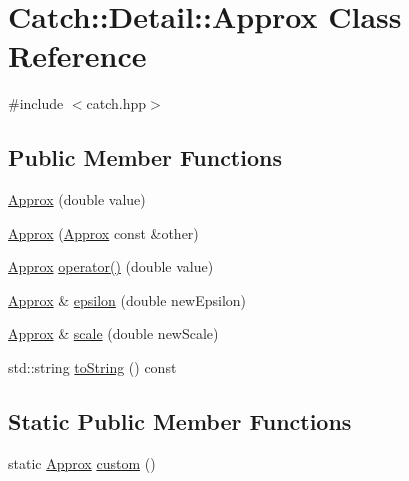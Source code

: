 \hypertarget{class_catch_1_1_detail_1_1_approx}{}\section{Catch\+:\+:Detail\+:\+:Approx Class Reference}
\label{class_catch_1_1_detail_1_1_approx}


{\ttfamily \#include $<$catch.\+hpp$>$}

\subsection*{Public Member Functions}
\begin{DoxyCompactItemize}
\item 
\hyperlink{class_catch_1_1_detail_1_1_approx_a1a8618ea8db08c66bd3d9fe8f74b957a}{Approx} (double value)
\item 
\hyperlink{class_catch_1_1_detail_1_1_approx_a807330c63266fc914abdf6e461255a54}{Approx} (\hyperlink{class_catch_1_1_detail_1_1_approx}{Approx} const \&other)
\item 
\hyperlink{class_catch_1_1_detail_1_1_approx}{Approx} \hyperlink{class_catch_1_1_detail_1_1_approx_a48c9cbc28a05dc9dc8c3973b9eae2268}{operator()} (double value)
\item 
\hyperlink{class_catch_1_1_detail_1_1_approx}{Approx} \& \hyperlink{class_catch_1_1_detail_1_1_approx_a05c50c3ad0a971fab19345b5d94979a9}{epsilon} (double new\+Epsilon)
\item 
\hyperlink{class_catch_1_1_detail_1_1_approx}{Approx} \& \hyperlink{class_catch_1_1_detail_1_1_approx_acd80f0737bf38112beacd5ca95bef113}{scale} (double new\+Scale)
\item 
std\+::string \hyperlink{class_catch_1_1_detail_1_1_approx_a972fd9ac60607483263f1b0f0f9955e6}{to\+String} () const
\end{DoxyCompactItemize}
\subsection*{Static Public Member Functions}
\begin{DoxyCompactItemize}
\item 
static \hyperlink{class_catch_1_1_detail_1_1_approx}{Approx} \hyperlink{class_catch_1_1_detail_1_1_approx_aaf86dc0ee92272ac2d9839197a07951d}{custom} ()
\end{DoxyCompactItemize}
